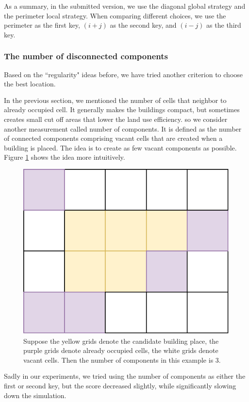 As a summary, in the submitted version, we use the diagonal global strategy and the perimeter local strategy. When comparing different choices, we use the perimeter as the first key, $(i+j)$ as the second key, and $(i-j)$ as the third key.

\subsubsection{The number of disconnected components}

Based on the ``regularity" ideas before, we have tried another criterion to choose the best location.

In the previous section, we mentioned the number of cells that neighbor to already occupied cell. It generally makes the buildings compact, but sometimes creates small cut off areas that lower the land use efficiency. so we consider another measurement called number of components. It is defined as the number of connected components comprising vacant cells that are created when a building is placed. The idea is to create as few vacant components as possible. Figure \ref{fig: numComponents} shows the idea more intuitively.

\begin{figure}
\center
\includegraphics[scale=0.5]{numComponents.pdf}
\caption{
Suppose the yellow grids denote the candidate building place,
the purple grids denote already occupied cells,
the white grids denote vacant cells.
Then the number of components in this example is 3.}
\label{fig: numComponents}
\end{figure}

Sadly in our experiments, we tried using the number of components as either the first or second key, but the score decreased slightly, while significantly slowing down the simulation.

